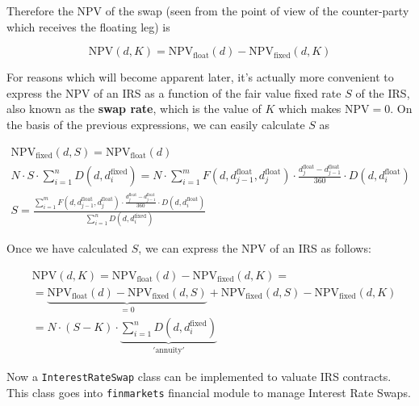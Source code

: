 Therefore the NPV of the swap (seen from the point of view of the counter-party which receives the floating leg) is

\begin{equation}\mathrm{NPV}(d, K) = \mathrm{NPV}_{\mathrm{float}}(d) - \mathrm{NPV}_{\mathrm{fixed}}(d, K)\end{equation}

For reasons which will become apparent later, it's actually more convenient to express the NPV of an IRS as a function of the fair value fixed rate $S$ of the IRS, also known as the \textbf{swap rate}, which is the value of $K$ which makes \(\mathrm{NPV}=0\). On the basis of the previous expressions, we can easily calculate $S$ as

\begin{equation}
\begin{gathered}
\mathrm{NPV}_{\mathrm{fixed}}(d, S) = \mathrm{NPV}_{\mathrm{float}}(d)\\[5pt]
N\cdot S\cdot\sum_{i=1}^{n}D(d, d_{i}^{\mathrm{fixed}}) = N\cdot\sum_{i=1}^{m}F(d, d_{j-1}^{\mathrm{float}}, d_{j}^{\mathrm{float}}) \cdot \frac{d_{j}^{\mathrm{float}}-d_{j-1}^{\mathrm{float}}}{360} \cdot D(d, d_{i}^{\mathrm{float}})\\[5pt]
S=\frac{\sum_{i=1}^{m}F(d, d_{j-1}^{\mathrm{float}}, d_{j}^{\mathrm{float}}) \cdot \frac{d_{j}^{\mathrm{float}}-d_{j-1}^{\mathrm{float}}}{360}
\cdot D(d, d_{i}^{\mathrm{float}})}{\sum_{i=1}^{n}D(d, d_i^{\mathrm{fixed}})}
\end{gathered}
\end{equation}

Once we have calculated \(S\), we can express the \(\mathrm{NPV}\) of an IRS as follows:

\begin{equation}
\begin{split}&\mathrm{NPV}(d, K) = \mathrm{NPV}_{\mathrm{float}}(d) - \mathrm{NPV}_{\mathrm{fixed}}(d, K) = \\ 
&= \underbrace{\mathrm{NPV}_{\mathrm{float}}(d) - \mathrm{NPV}_{\mathrm{fixed}}(d, S)}_{\textstyle\mathrm{=0}} + \mathrm{NPV}_{\mathrm{fixed}}(d, S) - \mathrm{NPV}_{\mathrm{fixed}}(d, K) \\ 
& = N\cdot(S-K)\cdot\underbrace{\sum_{i=1}^{n}D(d, d_{i}^{\mathrm{fixed}})}_{\textstyle \mathrm{'annuity'}}
\end{split}
\end{equation}

\begin{finmarkets}
Now a \texttt{InterestRateSwap} class can be implemented to valuate IRS contracts.
This class goes into \texttt{finmarkets} financial module to manage Interest Rate Swaps.
\end{finmarkets}

